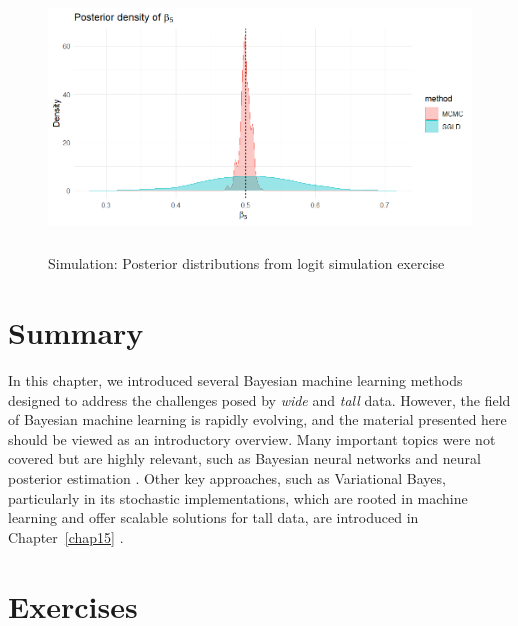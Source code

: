 \begin{figure}[!h]
	\centering
	\includegraphics[width=340pt, height=200pt]{Chapters/chapter13/figures/SGLDlogit.png}
	\caption{Simulation: Posterior distributions from logit simulation exercise}
	\label{SGLDlogit}
\end{figure}  

\section{Summary}\label{13_6}

In this chapter, we introduced several Bayesian machine learning methods designed to address the challenges posed by \textit{wide} and \textit{tall} data. However, the field of Bayesian machine learning is rapidly evolving, and the material presented here should be viewed as an introductory overview. Many important topics were not covered but are highly relevant, such as Bayesian neural networks \cite{neal2012bayesian} and neural posterior estimation \cite{papamakarios2016fast,lueckmann2017flexible,greenberg2019automatic}. Other key approaches, such as Variational Bayes, particularly in its stochastic implementations, which are rooted in machine learning and offer scalable solutions for tall data, are introduced in Chapter~\ref{chap15} \cite{wainwright2008graphical}.

\section{Exercises}\label{13_7}

